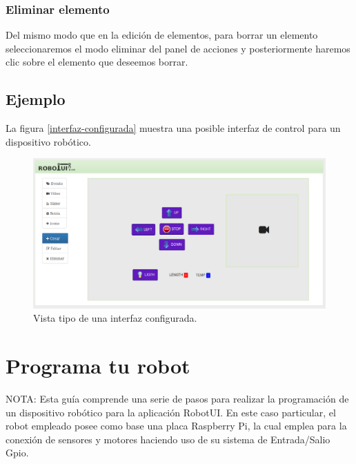 \subsubsection{Eliminar elemento}

Del mismo modo que en la edición de elementos, para borrar un elemento seleccionaremos el modo eliminar   del panel de acciones y posteriormente haremos clic sobre el elemento que deseemos borrar.\\


\subsection{Ejemplo}

La figura \ref{interfaz-configurada} muestra una posible interfaz de control para un dispositivo robótico.

\begin{figure}[H]
  \begin{center}
    \includegraphics[scale=.4]{imagenes/manual-usuario/interfaz-creada.png}
  \end{center}
  \caption{Vista tipo de una interfaz configurada.}
  \label{website:interfaz-configurada}
\end{figure}



\section{ Programa tu robot }
\label{sec:programacion-robot}

NOTA: Esta guía comprende una serie de pasos para realizar la programación de un dispositivo robótico para la aplicación RobotUI. En este caso particular, el robot empleado posee como base una placa 
Raspberry Pi, la cual emplea para la conexión de sensores y motores haciendo uso de su sistema de Entrada/Salio Gpio.\\

